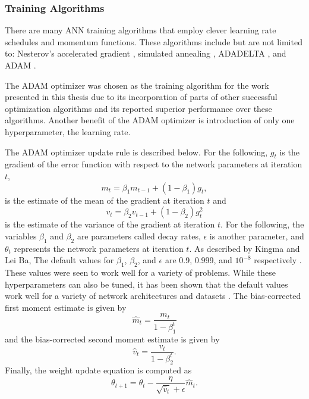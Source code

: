 \subsubsection{Training Algorithms}

There are many ANN training algorithms that employ clever learning rate schedules and momentum functions. These algorithms include but are not limited to: Nesterov's accelerated gradient \cite{nesterov1983}, simulated annealing \cite{Kirkpatrick1983}, ADADELTA \cite{ADADELTA}, and ADAM \cite{Kingma2015}. 

The ADAM optimizer was chosen as the training algorithm for the work presented in this thesis due to its incorporation of parts of other successful optimization algorithms and its reported superior performance over these algorithms. Another benefit of the ADAM optimizer is introduction of only one hyperparameter, the learning rate. 

The ADAM optimizer update rule is described below. For the following, $g_t$ is the gradient of the error function with respect to the network parameters at iteration $t$, 
\begin{equation} \label{eq:adam1}
m_t = \beta_1 m_{t-1} + (1 - \beta_1) g_t,
\end{equation}
is the estimate of the mean of the gradient at iteration $t$ and
\begin{equation} \label{eq:adam2}
v_t = \beta_2 v_{t-1} + (1 - \beta_2) g_t^2
\end{equation}
is the estimate of the variance of the gradient at iteration $t$. For the following, the variables $\beta_1$ and $\beta_2$ are parameters called decay rates, $\epsilon$ is another parameter, and $\theta_t$ represents the network parameters at iteration $t$. As described by Kingma and Lei Ba, The default values for $\beta_1$, $\beta_2$, and $\epsilon$ are 0.9, 0.999, and $10^{-8}$ respectively \cite{Kingma2015}. These values were seen to work well for a variety of problems. While these hyperparameters can also be tuned, it has been shown that the default values work well for a variety of network architectures and datasets \cite{Kingma2015}. The bias-corrected first moment estimate is given by
\begin{equation} \label{eq:adam3}
\hat{m}_t = \dfrac{m_t}{1 - \beta^t_1}
\end{equation}
and the bias-corrected second moment estimate is given by 
\begin{equation} \label{eq:adam4}
\hat{v}_t = \dfrac{v_t}{1 - \beta^t_2}.
\end{equation}
Finally, the weight update equation is computed as
\begin{equation} \label{eq:adam5}
\theta_{t+1} = \theta_{t} - \dfrac{\eta}{\sqrt{\hat{v}_t} + \epsilon} \hat{m}_t.
\end{equation}


